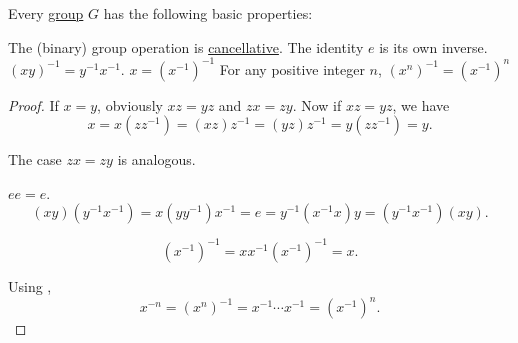 \begin{proposition}\label{thm:def:group/properties}
  Every \hyperref[def:group]{group} \( G \) has the following basic properties:
  \begin{thmenum}
     The (binary) group operation is \hyperref[def:magma/cancellative]{cancellative}.
     The identity \( e \) is its own inverse.
     \( (xy)^{-1} = y^{-1} x^{-1} \).
     \( x = (x^{-1})^{-1} \)
     For any positive integer \( n \), \( (x^n)^{-1} = (x^{-1})^n \)
  \end{thmenum}
\end{proposition}
\begin{proof}
   If \( x = y \), obviously \( xz = yz \) and \( zx = zy \). Now if \( xz = yz \), we have
  \begin{equation*}
    x = x(zz^{-1}) = (xz)z^{-1} = (yz)z^{-1} = y(zz^{-1}) = y.
  \end{equation*}

  The case \( zx = zy \) is analogous.

   \( ee = e \).
  \begin{equation*}
    (xy) (y^{-1} x^{-1})
    =
    x (y y^{-1}) x^{-1}
    =
    e
    =
    y^{-1} (x^{-1} x) y
    =
    (y^{-1} x^{-1}) (xy).
  \end{equation*}

  \begin{equation*}
    (x^{-1})^{-1}
    =
    x x^{-1} (x^{-1})^{-1}
    =
    x.
  \end{equation*}

   Using ,
  \begin{equation*}
    x^{-n}
    =
    (x^n)^{-1}
    =
    x^{-1} \cdots x^{-1}
    =
    (x^{-1})^n.
  \end{equation*}
\end{proof}

